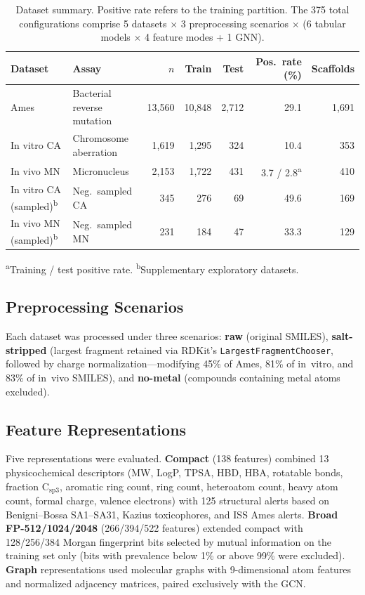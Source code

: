 \begin{table}[ht]
\caption{Dataset summary. Positive rate refers to the training partition. The 375 total configurations comprise 5 datasets $\times$ 3 preprocessing scenarios $\times$ (6 tabular models $\times$ 4 feature modes + 1 GNN).}
\label{tab:datasets}
\centering
\small
\begin{tabular}{@{}llrrrrr@{}}
\toprule
Dataset & Assay & $n$ & Train & Test & Pos.\ rate (\%) & Scaffolds \\
\midrule
Ames & Bacterial reverse mutation & 13,560 & 10,848 & 2,712 & 29.1 & 1,691 \\
In vitro CA & Chromosome aberration & 1,619 & 1,295 & 324 & 10.4 & 353 \\
In vivo MN & Micronucleus & 2,153 & 1,722 & 431 & 3.7 / 2.8\textsuperscript{a} & 410 \\
\midrule
In vitro CA (sampled)\textsuperscript{b} & Neg.\ sampled CA & 345 & 276 & 69 & 49.6 & 169 \\
In vivo MN (sampled)\textsuperscript{b} & Neg.\ sampled MN & 231 & 184 & 47 & 33.3 & 129 \\
\bottomrule
\end{tabular}

\medskip
\footnotesize
\textsuperscript{a}Training / test positive rate.
\textsuperscript{b}Supplementary exploratory datasets.
\end{table}

\subsection{Preprocessing Scenarios}

Each dataset was processed under three scenarios: \textbf{raw} (original SMILES), \textbf{salt-stripped} (largest fragment retained via RDKit's \texttt{LargestFragmentChooser},\cite{RDKit} followed by charge normalization---modifying 45\% of Ames, 81\% of in~vitro, and 83\% of in~vivo SMILES), and \textbf{no-metal} (compounds containing metal atoms excluded).

\subsection{Feature Representations}

Five representations were evaluated. \textbf{Compact} (138 features) combined 13 physicochemical descriptors (MW, LogP, TPSA, HBD, HBA, rotatable bonds, fraction $\mathrm{C_{sp3}}$, aromatic ring count, ring count, heteroatom count, heavy atom count, formal charge, valence electrons) with 125 structural alerts based on Benigni--Bossa SA1--SA31,\cite{Benigni_Bossa_2008,Benigni_2013} Kazius toxicophores,\cite{Kazius_2005} and ISS Ames alerts. \textbf{Broad FP-512/1024/2048} (266/394/522 features) extended compact with 128/256/384 Morgan fingerprint bits\cite{Rogers_Hahn_2010} selected by mutual information\cite{Kraskov_2004} on the training set only (bits with prevalence below 1\% or above 99\% were excluded). \textbf{Graph} representations used molecular graphs with 9-dimensional atom features and normalized adjacency matrices, paired exclusively with the GCN.

